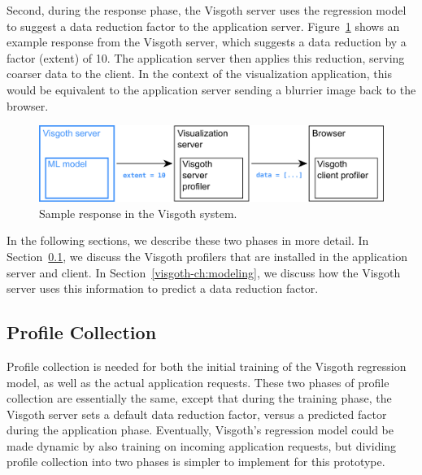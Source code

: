 Second, during the response phase, the Visgoth server uses the regression model
to suggest a data reduction factor to the application server.
Figure~\ref{fig:system-response} shows an example response from the Visgoth
server, which suggests a data reduction by a factor (extent) of 10. The
application server then applies this reduction, serving coarser data to the
client. In the context of the visualization application, this would be
equivalent to the application server sending a blurrier image back to the
browser.\\

\begin{figure}[h]
\begin{center}
\includegraphics[scale=0.5]{./img/system-response.png}
\caption{Sample response in the Visgoth system.}
\label{fig:system-response}
\end{center}
\end{figure}

In the following sections, we describe these two phases in more detail. In
Section~\ref{visgoth-ch:profile-collection}, we discuss the Visgoth profilers that are
installed in the application server and client. In Section~\ref{visgoth-ch:modeling}, we
discuss how the Visgoth server uses this information to predict a data
reduction factor.\\

  \subsection{Profile Collection}\label{visgoth-ch:profile-collection}

  Profile collection is needed for both the initial training of the Visgoth
  regression model, as well as the actual application requests. These two
  phases of profile collection are essentially the same, except that during the
  training phase, the Visgoth server sets a default data reduction factor,
  versus a predicted factor during the application phase. Eventually, Visgoth's
  regression model could be made dynamic by also training on incoming
  application requests, but dividing profile collection into two phases is
  simpler to implement for this prototype.\\

